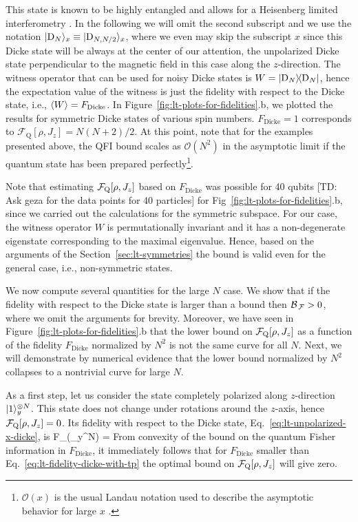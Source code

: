 This state is known to be highly entangled \cite{} and allows for a Heisenberg limited interferometry \cite{}.
In the following we will omit the second subscript and we use the notation $\vert{\ensuremath{\textnormal{D}_{N}}}\rangle_{x}\equiv \vert{\ensuremath{\textnormal{D}_{N,N/2}}}\rangle_{x}$, where we even may skip the subscript $x$ since this Dicke state will be always at the center of our attention, the unpolarized Dicke state perpendicular to the magnetic field in this case along the $z$-direction.
The witness operator that can be used for noisy Dicke states is $W=\vert{\ensuremath{\textnormal{D}_{N}}}\rangle{\!}\langle{\ensuremath{\textnormal{D}_{N}}}\vert$, hence the expectation value of the witness is just the fidelity with respect to the Dicke state, i.e., $\langle{W}\rangle=F_{\text{Dicke}}$.
In Figure~\ref{fig:lt-plots-for-fidelities}.b, we plotted the results for symmetric Dicke states of various spin numbers.
$F_{\text{Dicke}}=1$ corresponds to $\mathcal{F}_{\text{Q}}[\rho,J_z]=N(N+2)/2$.
At this point, note that for the examples presented above, the QFI bound scales as $\mathcal{O}(N^2)$ in the asymptotic limit if the quantum state has been prepared perfectly\footnote{$\mathcal{O}(x)$ is the usual Landau notation used to describe the asymptotic behavior for large $x$ \cite{}.}.

Note that estimating $\mathcal{F}_{\textnormal{Q}}[{\textstyle \rho, J_z}]$ based on $F_{\text{Dicke}}$ was possible for 40 qubits [TD: Ask geza for the data points for 40 particles] for Fig~\ref{fig:lt-plots-for-fidelities}.b, since we carried out the calculations for the symmetric subspace.
For our case, the witness operator $W$ is permutationally invariant and it has a non-degenerate eigenstate corresponding to the maximal eigenvalue.
Hence, based on the arguments of the Section~\ref{sec:lt-symmetries} the bound is valid even for the general case, i.e., non-symmetric states.

We now compute several quantities for the large $N$ case.
We show that if the fidelity with respect to the Dicke state is larger than a bound then $\mathcal{B}_{\, \mathcal{F} }>0$, where we omit the arguments for brevity.
Moreover, we have seen in Figure~\ref{fig:lt-plots-for-fidelities}.b that the lower bound on $\mathcal{F}_{\textnormal{Q}}[{\textstyle \rho,J_z}]$ as a function of the fidelity $F_{\text{Dicke}}$ normalized by $N^2$ is not the same curve for all $N$.
Next, we will demonstrate by numerical evidence that the lower bound normalized by $N^2$ collapses to a nontrivial curve for large $N$.

As a first step, let us consider the state completely polarized along $z$-direction $\vert{1}\rangle_y^{\otimes N}$.
This state does not change under rotations around the $z$-axis, hence $\mathcal{F}_{\textnormal{Q}}[{\textstyle \rho,J_z}]=0$.
Its fidelity with respect to the Dicke state, Eq.~\eqref{eq:lt-unpolarized-x-dicke}, is
\be
  \label{eq:lt-fidelity-dicke-with-tp}
  F_{}(_y^{\otimes N}) = \approx {}
\ee
From convexity of the bound on the quantum Fisher information in $F_{\text{Dicke}}$, it immediately follows that for $F_{\text{Dicke}}$ smaller than Eq.~\eqref{eq:lt-fidelity-dicke-with-tp} the optimal bound on $\mathcal{F}_{\textnormal{Q}}[{\textstyle \rho,J_z}]$ will give zero.

